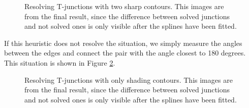 \documentclass[]{usiinfbachelorproject}
\begin{document}
\begin{figure}[ht]
	\centering
	\caption{Resolving T-junctions with two sharp contours. This images are from the final result, since the difference between solved junctions and not solved ones is only visible after the splines have been fitted.}
	\label{fig:junction1}
\end{figure}

If this heuristic does not resolve the situation, we simply measure the angles between the edges and connect the pair with the angle closest to 180 degrees. This situation is shown in Figure \ref{fig:junction2}.

\begin{figure}[ht]
	\centering
	\caption{Resolving T-junctions with only shading contours. This images are from the final result, since the difference between solved junctions and not solved ones is only visible after the splines have been fitted.}
	\label{fig:junction2}
\end{figure}
\end{document}
